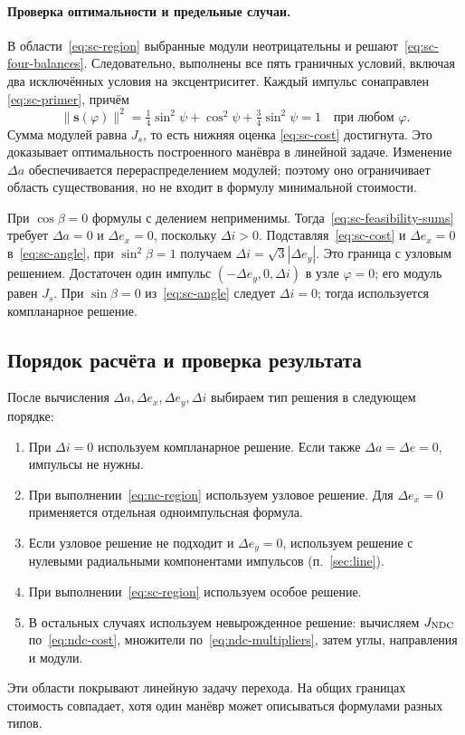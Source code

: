 \paragraph{Проверка оптимальности и предельные случаи.}
В области~\eqref{eq:sc-region} выбранные модули неотрицательны
и решают~\eqref{eq:sc-four-balances}. Следовательно, выполнены
все пять граничных условий, включая два исключённых условия
на эксцентриситет. Каждый импульс сонаправлен
\eqref{eq:sc-primer}, причём
\[
 \|\boldsymbol s(\varphi)\|^2
 =\tfrac14\sin^2\psi+\cos^2\psi+\tfrac34\sin^2\psi=1
 \quad\text{при любом }\varphi.
\]
Сумма модулей равна $J_s$, то есть нижняя оценка
\eqref{eq:sc-cost} достигнута. Это доказывает оптимальность
построенного манёвра в линейной задаче.
Изменение $\Delta a$ обеспечивается перераспределением модулей;
поэтому оно ограничивает область существования, но не входит
в формулу минимальной стоимости.

При $\cos\beta=0$ формулы с делением неприменимы.
Тогда~\eqref{eq:sc-feasibility-sums} требует $\Delta a=0$ и
$\Delta e_x=0$, поскольку $\Delta i>0$.
Подставляя~\eqref{eq:sc-cost} и $\Delta e_x=0$
в~\eqref{eq:sc-angle}, при $\sin^2\beta=1$ получаем
$\Delta i=\sqrt3|\Delta e_y|$.
Это граница с узловым решением. Достаточен один импульс
$(-\Delta e_y,0,\Delta i)$ в узле $\varphi=0$;
его модуль равен $J_s$.
При $\sin\beta=0$ из~\eqref{eq:sc-angle} следует $\Delta i=0$;
тогда используется компланарное решение.


\subsection{Порядок расчёта и проверка результата}
\label{sec:transfer-check}

После вычисления $\Delta a,\Delta e_x,\Delta e_y,\Delta i$ выбираем
тип решения в следующем порядке:
\begin{enumerate}[nosep]
 \item При $\Delta i=0$ используем компланарное решение.
 Если также $\Delta a=\Delta e=0$, импульсы не нужны.
 \item При выполнении~\eqref{eq:nc-region} используем узловое решение.
 Для $\Delta e_x=0$ применяется отдельная одноимпульсная формула.
 \item Если узловое решение не подходит и $\Delta e_y=0$, используем решение
 с нулевыми радиальными компонентами импульсов (п.~\ref{sec:line}).
 \item При выполнении~\eqref{eq:sc-region} используем особое решение.
 \item В остальных случаях используем невырожденное решение: вычисляем
 $J_{\rm NDC}$ по~\eqref{eq:ndc-cost}, множители
 по~\eqref{eq:ndc-multipliers}, затем углы, направления и модули.
\end{enumerate}
Эти области покрывают линейную задачу перехода.
На общих границах стоимость совпадает, хотя один манёвр может
описываться формулами разных типов.

